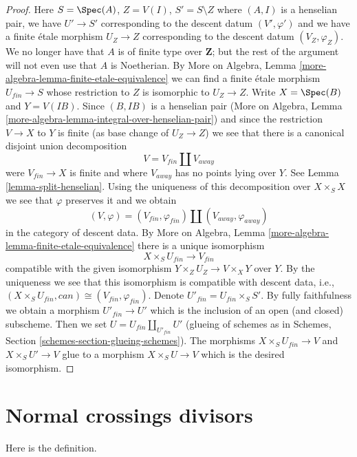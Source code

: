 \begin{proof}
\medskip\noindent
Here $S = \Spec(A)$, $Z = V(I)$, $S' = S \setminus Z$ where
$(A, I)$ is a henselian pair, we have $U' \to S'$ corresponding
to the descent datum $(V', \varphi')$ and we have a finite \'etale
morphism $U_Z \to Z$ corresponding to the descent datum
$(V_Z, \varphi_Z)$. We no longer have that $A$ is of finite type
over $\mathbf{Z}$; but the rest of the argument will not even use
that $A$ is Noetherian.
By More on Algebra, Lemma \ref{more-algebra-lemma-finite-etale-equivalence}
we can find a finite \'etale morphism $U_{fin} \to S$ whose
restriction to $Z$ is isomorphic to $U_Z \to Z$.
Write $X = \Spec(B)$ and $Y = V(IB)$. Since $(B, IB)$ is a henselian pair
(More on Algebra, Lemma \ref{more-algebra-lemma-integral-over-henselian-pair})
and since the restriction $V \to X$ to $Y$
is finite (as base change of $U_Z \to Z$) we see that
there is a canonical disjoint union decomposition
$$
V = V_{fin} \amalg V_{away}
$$
were $V_{fin} \to X$ is finite and where $V_{away}$ has no
points lying over $Y$. See Lemma \ref{lemma-split-henselian}.
Using the uniqueness of this decomposition over $X \times_S X$
we see that $\varphi$ preserves it and we obtain
$$
(V, \varphi) = (V_{fin}, \varphi_{fin}) \amalg (V_{away}, \varphi_{away})
$$
in the category of descent data.
By More on Algebra, Lemma \ref{more-algebra-lemma-finite-etale-equivalence}
there is a unique isomorphism
$$
X \times_S U_{fin} \longrightarrow V_{fin}
$$
compatible with the given isomorphism $Y \times_Z U_Z \to V \times_X Y$
over $Y$.
By the uniqueness we see that this isomorphism is compatible
with descent data, i.e.,
$(X \times_S U_{fin}, can) \cong (V_{fin}, \varphi_{fin})$.
Denote $U'_{fin} = U_{fin} \times_S S'$. By fully faithfulness
we obtain a morphism $U'_{fin} \to U'$ which is
the inclusion of an open (and closed) subscheme.
Then we set $U = U_{fin} \amalg_{U'_{fin}} U'$ (glueing of schemes as
in Schemes, Section \ref{schemes-section-glueing-schemes}).
The morphisms $X \times_S U_{fin} \to V$ and
$X \times_S U' \to V$ glue to a morphism $X \times_S U \to V$
which is the desired isomorphism.
\end{proof}





\section{Normal crossings divisors}
\label{section-normal-crossings}

\noindent
Here is the definition.

